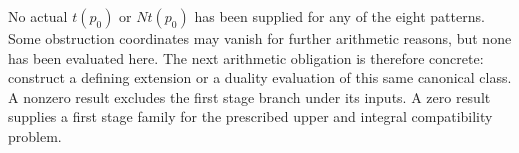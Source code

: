 No actual $t(p_0)$ or $Nt(p_0)$ has been supplied for any of the eight patterns. Some obstruction coordinates may vanish for further arithmetic reasons, but none has been evaluated here. The next arithmetic obligation is therefore concrete: construct a defining extension or a duality evaluation of this same canonical class. A nonzero result excludes the first stage branch under its inputs. A zero result supplies a first stage family for the prescribed upper and integral compatibility problem.
